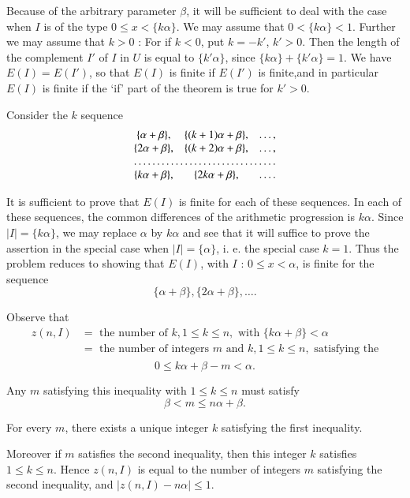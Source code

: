 Because of the arbitrary parameter $\beta$, it will be sufficient to deal with the case when $I$ is of the type $0 \leq x < \{k \alpha\}$. We may assume that $0 < \{k \alpha\} < 1$. Further we may assume that $k > 0$ : For if $k < 0$, put $k=-k'$, $k' > 0$. Then the length of the complement $I'$ of $I$ in $U$ is equal to $\{k' \alpha\}$, since $\{k\alpha\} + \{k' \alpha\} = 1$. We have $E(I) = E(I')$, so that $E(I)$ is finite if $E(I')$ is finite,\pageoriginale and in particular $E(I)$ is finite if the `if' part of the theorem is true for $k' > 0$.

Consider the $k$ sequence
\begin{equation*}
 \begin{matrix}
  \{\alpha + \beta\},  & \{(k+1)\alpha + \beta\}, & \ldots,\\
  \{2\alpha + \beta\}, & \{(k+2)\alpha + \beta\}, & \ldots,\\
  \hdotsfor{3}\\
  \{k\alpha + \beta\}, & \{2k\alpha + \beta\}, & \ldots .
 \end{matrix}
\end{equation*}

It is sufficient to prove that $E(I)$ is finite for each of these sequences. In each of these sequences, the common differences of the arithmetic progression is $k \alpha$. Since $|I| = \{k \alpha\}$, we may replace $\alpha$ by $k \alpha$ and see that it will suffice to prove the assertion in the special case when $|I| = \{\alpha\}$, i. e. the special case $k = 1$. Thus the problem reduces to showing that $E(I)$, with $I$ : $0 \leq x < \alpha$, is finite for the sequence
$$
\{\alpha + \beta\}, \{2\alpha + \beta\}, \ldots .
$$

Observe that
\begin{align*}
z(n, I) & = \text{ the number of }k, 1 \leq k \leq n, \text{ with } \{k \alpha + \beta\} < \alpha\\
& = \text{ the number of integers } m \text{ and }k, 1 \leq k \leq n, \text{ satisfying the}\\ 
& \tag*{inequality } 
\end{align*}
$$
0 \leq k\alpha + \beta -m < \alpha.
$$

Any $m$ satisfying this inequality with $1 \leq k \leq n$ must satisfy
$$
\beta < m \leq n\alpha + \beta.
$$

For every $m$, there exists a unique integer $k$ satisfying the first inequality.

Moreover if $m$ satisfies the second inequality, then this integer $k$ satisfies $1 \leq k \leq n$. Hence $z(n, I)$ is equal to the number of integers $m$ satisfying the second inequality, and $|z(n, I) - n\alpha| \leq 1$.

